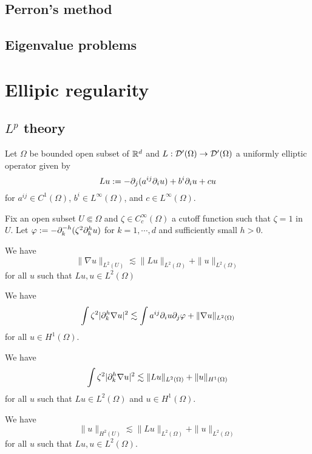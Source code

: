 \documentclass{../../large}
\begin{document}
\section{Perron's method}

\section{Eigenvalue problems}






\chapter{Ellipic regularity}
\section{$L^p$ theory}
\begin{prb}
Let $\Omega$ be bounded open subset of $\mathbb{R}^d$ and $L:\mathcal{D}'(\Omega)\to\mathcal{D}'(\Omega)$ a uniformly elliptic operator given by
\[Lu:=-\pd_j(a^{ij}\pd_iu)+b^i\pd_iu+cu\]
for $a^{ij}\in C^1(\Omega)$, $b^i\in L^\infty(\Omega)$, and $c\in L^\infty(\Omega)$.

Fix an open subset $U\Subset\Omega$ and $\zeta\in C_c^\infty(\Omega)$ a cutoff function such that $\zeta=1$ in $U$.
Let $\f:=-\pd_k^{-h}(\zeta^2\pd_k^hu)$ for $k=1,\cdots,d$ and sufficiently small $h>0$.
\begin{parts}
\item We have
\[\|\nabla u\|_{L^2(U)}\lesssim\|Lu\|_{L^2(\Omega)}+\|u\|_{L^2(\Omega)}\]
for all $u$ such that $Lu,u\in L^2(\Omega)$
\item We have
\[\int\zeta^2|\pd_k^h\nabla u|^2\lesssim\int a^{ij}\pd_iu\pd_j\f+\|\nabla u\|_{L^2(\Omega)}\]
for all $u\in H^1(\Omega)$.
\item We have
\[\int\zeta^2|\pd_k^h\nabla u|^2\lesssim\|Lu\|_{L^2(\Omega)}+\|u\|_{H^1(\Omega)}\]
for all $u$ such that $Lu\in L^2(\Omega)$ and $u\in H^1(\Omega)$.
\item We have
\[\|u\|_{H^2(U)}\lesssim\|Lu\|_{L^2(\Omega)}+\|u\|_{L^2(\Omega)}\]
for all $u$ such that  $Lu,u\in L^2(\Omega)$.
\end{parts}
\end{prb}
\end{document}
